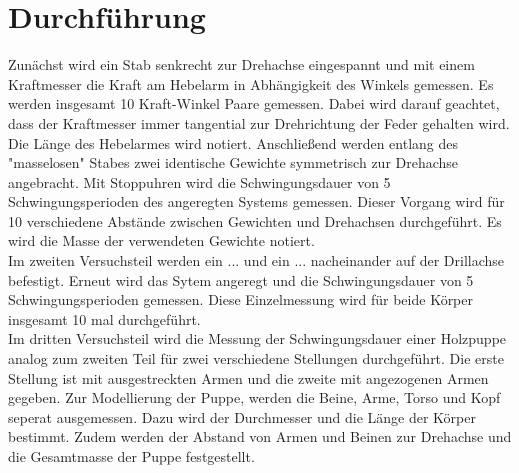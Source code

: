 \section{Durchführung}
\label{sec:Durchführung}

Zunächst wird ein Stab senkrecht zur Drehachse eingespannt und 
mit einem Kraftmesser die Kraft am Hebelarm in Abhängigkeit des 
Winkels gemessen. Es werden insgesamt 10 Kraft-Winkel Paare 
gemessen. Dabei wird darauf geachtet, dass der Kraftmesser immer
tangential zur Drehrichtung der Feder gehalten wird. Die Länge 
des Hebelarmes wird notiert. 
Anschließend werden entlang des "masselosen" Stabes zwei identische
Gewichte symmetrisch zur Drehachse angebracht. Mit Stoppuhren 
wird die Schwingungsdauer von 5 Schwingungsperioden des angeregten
Systems gemessen. Dieser Vorgang wird für 10 verschiedene Abstände 
zwischen Gewichten und Drehachsen durchgeführt. Es wird die Masse 
der verwendeten Gewichte notiert. \\
\newline
Im zweiten Versuchsteil werden ein ... und ein ... nacheinander 
auf der Drillachse befestigt. Erneut wird das Sytem angeregt 
und die Schwingungsdauer von 5 Schwingungsperioden gemessen. 
Diese Einzelmessung wird für beide Körper insgesamt 10 mal durchgeführt.\\
\newline
Im dritten Versuchsteil wird die Messung der Schwingungsdauer einer 
Holzpuppe analog zum zweiten Teil für zwei verschiedene Stellungen 
durchgeführt. Die erste Stellung ist mit ausgestreckten Armen und die
zweite mit angezogenen Armen gegeben. Zur Modellierung 
der Puppe, werden die Beine, Arme, Torso und Kopf seperat ausgemessen. 
Dazu wird der Durchmesser und die Länge der Körper bestimmt. Zudem 
werden der Abstand von Armen und Beinen zur Drehachse und die 
Gesamtmasse der Puppe festgestellt. 